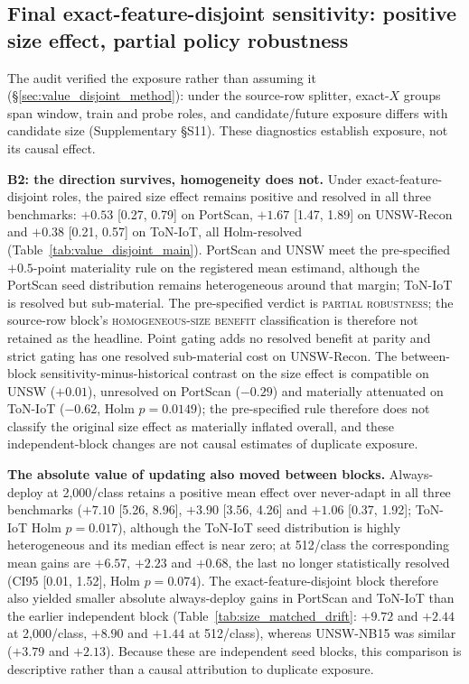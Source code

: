 \documentclass[a4paper,fleqn]{cas-sc}
\begin{document}
\subsection{Final exact-feature-disjoint sensitivity: positive size effect, partial policy robustness}
\label{sec:value_disjoint}

The audit verified the exposure rather than assuming it (\S\ref{sec:value_disjoint_method}): under the source-row splitter, exact-$X$ groups span window, train and probe roles, and candidate/future exposure differs with candidate size (Supplementary \S S11). These diagnostics establish exposure, not its causal effect.



\textbf{B2: the direction survives, homogeneity does not.} Under exact-feature-disjoint roles, the paired size effect remains positive and resolved in all three benchmarks: $+0.53$ [0.27, 0.79] on PortScan, $+1.67$ [1.47, 1.89] on UNSW-Recon and $+0.38$ [0.21, 0.57] on ToN-IoT, all Holm-resolved (Table~\ref{tab:value_disjoint_main}). PortScan and UNSW meet the pre-specified $+0.5$-point materiality rule on the registered mean estimand, although the PortScan seed distribution remains heterogeneous around that margin; ToN-IoT is resolved but sub-material. The pre-specified verdict is \textsc{partial robustness}; the source-row block's \textsc{homogeneous-size benefit} classification is therefore not retained as the headline. Point gating adds no resolved benefit at parity and strict gating has one resolved sub-material cost on UNSW-Recon. The between-block sensitivity-minus-historical contrast on the size effect is compatible on UNSW ($+0.01$), unresolved on PortScan ($-0.29$) and materially attenuated on ToN-IoT ($-0.62$, Holm $p=0.0149$); the pre-specified rule therefore does not classify the original size effect as materially inflated overall, and these independent-block changes are not causal estimates of duplicate exposure.

\textbf{The absolute value of updating also moved between blocks.} Always-deploy at 2{,}000/class retains a positive mean effect over never-adapt in all three benchmarks ($+7.10$ [5.26, 8.96], $+3.90$ [3.56, 4.26] and $+1.06$ [0.37, 1.92]; ToN-IoT Holm $p=0.017$), although the ToN-IoT seed distribution is highly heterogeneous and its median effect is near zero; at 512/class the corresponding mean gains are $+6.57$, $+2.23$ and $+0.68$, the last no longer statistically resolved (CI95 [0.01, 1.52], Holm $p=0.074$). The exact-feature-disjoint block therefore also yielded smaller absolute always-deploy gains in PortScan and ToN-IoT than the earlier independent block (Table~\ref{tab:size_matched_drift}: $+9.72$ and $+2.44$ at 2{,}000/class, $+8.90$ and $+1.44$ at 512/class), whereas UNSW-NB15 was similar ($+3.79$ and $+2.13$). Because these are independent seed blocks, this comparison is descriptive rather than a causal attribution to duplicate exposure.
\end{document}
